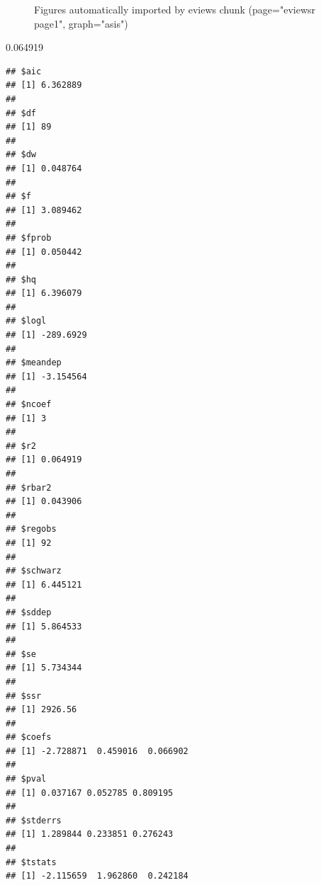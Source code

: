 \documentclass[
]{article}
\newenvironment{Shaded}{\begin{snugshade}}{\end{snugshade}}
\newcommand{\ErrorTok}[1]{\textcolor[rgb]{0.64,0.00,0.00}{\textbf{#1}}}
\newcommand{\FunctionTok}[1]{\textcolor[rgb]{0.00,0.00,0.00}{#1}}
\newcommand{\NormalTok}[1]{#1}
\newcommand{\SpecialCharTok}[1]{\textcolor[rgb]{0.00,0.00,0.00}{#1}}
\newcommand{\StringTok}[1]{\textcolor[rgb]{0.31,0.60,0.02}{#1}}
\begin{document}
\begin{figure}[h]

{\centering {}

}

\caption{Figures automatically imported by eviews chunk (page="eviewsr page1", graph="asis")}\label{fig:ev}
\end{figure}

0.064919

\begin{Shaded}
\end{Shaded}

\begin{verbatim}
## $aic
## [1] 6.362889
## 
## $df
## [1] 89
## 
## $dw
## [1] 0.048764
## 
## $f
## [1] 3.089462
## 
## $fprob
## [1] 0.050442
## 
## $hq
## [1] 6.396079
## 
## $logl
## [1] -289.6929
## 
## $meandep
## [1] -3.154564
## 
## $ncoef
## [1] 3
## 
## $r2
## [1] 0.064919
## 
## $rbar2
## [1] 0.043906
## 
## $regobs
## [1] 92
## 
## $schwarz
## [1] 6.445121
## 
## $sddep
## [1] 5.864533
## 
## $se
## [1] 5.734344
## 
## $ssr
## [1] 2926.56
## 
## $coefs
## [1] -2.728871  0.459016  0.066902
## 
## $pval
## [1] 0.037167 0.052785 0.809195
## 
## $stderrs
## [1] 1.289844 0.233851 0.276243
## 
## $tstats
## [1] -2.115659  1.962860  0.242184
\end{verbatim}
\end{document}
